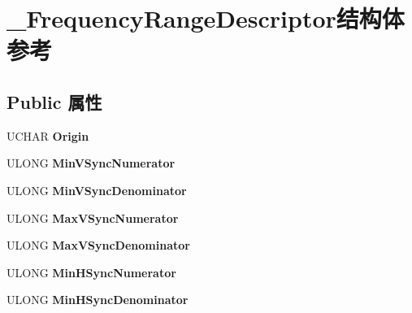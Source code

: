 \hypertarget{struct___frequency_range_descriptor}{}\section{\+\_\+\+Frequency\+Range\+Descriptor结构体 参考}
\label{struct___frequency_range_descriptor}
\subsection*{Public 属性}
\begin{DoxyCompactItemize}
\item 
\mbox{\label{struct___frequency_range_descriptor_ad823e19c71018db721bfb0478638cd8a}} 
U\+C\+H\+AR {\bfseries Origin}
\item 
\mbox{\label{struct___frequency_range_descriptor_a861c93575d938cb33a24344df66d889f}} 
U\+L\+O\+NG {\bfseries Min\+V\+Sync\+Numerator}
\item 
\mbox{\label{struct___frequency_range_descriptor_abd563f904a4d36e07b13ee0e318b72c7}} 
U\+L\+O\+NG {\bfseries Min\+V\+Sync\+Denominator}
\item 
\mbox{\label{struct___frequency_range_descriptor_af422d9220d3bda19fd5890362b9d4be4}} 
U\+L\+O\+NG {\bfseries Max\+V\+Sync\+Numerator}
\item 
\mbox{\label{struct___frequency_range_descriptor_a78a2216d53e8895bc3dd852b70730d24}} 
U\+L\+O\+NG {\bfseries Max\+V\+Sync\+Denominator}
\item 
\mbox{\label{struct___frequency_range_descriptor_aa3a3f962765ff4ef6dce4e3106a34624}} 
U\+L\+O\+NG {\bfseries Min\+H\+Sync\+Numerator}
\item 
\mbox{\label{struct___frequency_range_descriptor_a2bafabd3aff3d8af826c35ab21fcd1d3}} 
U\+L\+O\+NG {\bfseries Min\+H\+Sync\+Denominator}
\item 
\mbox{\label{struct___frequency_range_descriptor_af57ac04737d3050188031a6943c0fe3b}} 

\end{DoxyCompactItemize}
